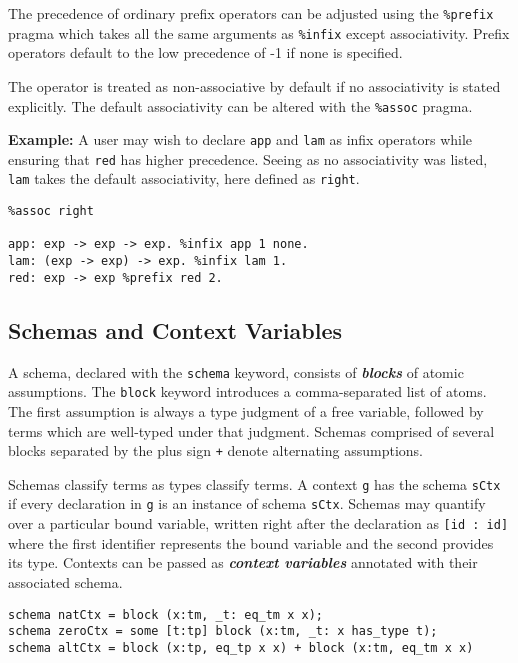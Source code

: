 \documentclass[11pt]{article}
\begin{document}
The precedence of ordinary prefix operators can be adjusted using the \texttt{\%prefix} pragma which takes all the same arguments as \texttt{\%infix} except associativity. Prefix operators default to the low precedence of -1 if none is specified.

The operator is treated as non-associative by default if no associativity is stated explicitly. The default associativity can be altered with the \texttt{\%assoc} pragma.

\textbf{Example:} A user may wish to declare \texttt{app} and \texttt{lam} as infix operators while ensuring that \texttt{red} has higher precedence. Seeing as no associativity was listed, \texttt{lam} takes the default associativity, here defined as \texttt{right}.
\begin{verbatim}
%assoc right

app: exp -> exp -> exp. %infix app 1 none.
lam: (exp -> exp) -> exp. %infix lam 1.
red: exp -> exp %prefix red 2. 
\end{verbatim}

\subsection{Schemas and Context Variables}
A schema, declared with the \texttt{schema} keyword, consists of \textbf{\textit{blocks}} of atomic assumptions. The \texttt{block} keyword introduces a comma-separated list of atoms. The first assumption is always a type judgment of a free variable, followed by terms which are well-typed under that judgment. Schemas comprised of several blocks separated by the plus sign \texttt{+} denote alternating assumptions. 

Schemas classify terms as types classify terms. A context \texttt{g} has the schema \texttt{sCtx} if every declaration in \texttt{g} is an instance of schema \texttt{sCtx}. Schemas may quantify over a particular bound variable, written right after the declaration as \texttt{[id : id]} where the first identifier represents the bound variable and the second provides its type. Contexts can be passed as \textit{\textbf{context variables}} annotated with their associated schema. 

\begin{verbatim}
schema natCtx = block (x:tm, _t: eq_tm x x);
schema zeroCtx = some [t:tp] block (x:tm, _t: x has_type t);
schema altCtx = block (x:tp, eq_tp x x) + block (x:tm, eq_tm x x) 
\end{verbatim}

\end{document}
